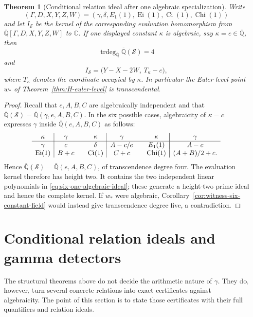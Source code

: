 \documentclass[11pt]{article}
\newtheorem{theorem}{Theorem}[section]
\theoremstyle{definition}
\theoremstyle{remark}
\newcommand{\Qbar}{\overline{\mathbb Q}}
\newcommand{\C}{\mathbb C}
\newcommand{\trdeg}{\operatorname{trdeg}}
\newcommand{\Ei}{\operatorname{Ei}}
\newcommand{\Ci}{\operatorname{Ci}}
\newcommand{\Chi}{\operatorname{Chi}}
\begin{document}
\begin{theorem}[Conditional relation ideal after one algebraic specialization]
\label{thm:six-one-algebraic}
Write
\[
 (\Gamma,D,X,Y,Z,W)
 =
 (\gamma,\delta,E_1(1),\Ei(1),\Ci(1),\Chi(1))
\]
and let \(I_{\mathcal S}\) be the kernel of the corresponding evaluation
homomorphism from \(\Qbar[\Gamma,D,X,Y,Z,W]\) to \(\C\).  If one displayed
constant \(\kappa\) is algebraic, say \(\kappa=c\in\Qbar\), then
\[
 \trdeg_{\Qbar}\Qbar(\mathcal S)=4
\]
and
\begin{equation}\label{eq:six-one-algebraic-ideal}
 \boxed{
 I_{\mathcal S}
 =\bigl(Y-X-2W,\ T_\kappa-c\bigr),}
\end{equation}
where \(T_\kappa\) denotes the coordinate occupied by \(\kappa\).  In
particular the Euler-level point \(w_*\) of
Theorem~\ref{thm:H-euler-level} is transcendental.
\end{theorem}

\begin{proof}
Recall that \(e,A,B,C\) are algebraically independent and that
\(\Qbar(\mathcal S)=\Qbar(\gamma,e,A,B,C)\).  In the six possible cases,
algebraicity of \(\kappa=c\) expresses \(\gamma\) inside
\(\Qbar(e,A,B,C)\) as follows:
\[
\begin{array}{c|c@{\qquad}c|c@{\qquad}c|c}
 \kappa&\gamma&\kappa&\gamma&\kappa&\gamma\\ \hline
 \gamma&c&\delta&A-c/e&E_1(1)&A-c\\
 \Ei(1)&B+c&\Ci(1)&C+c&\Chi(1)&(A+B)/2+c.
\end{array}
\]
Hence \(\Qbar(\mathcal S)=\Qbar(e,A,B,C)\), of transcendence degree four.
The evaluation kernel therefore has height two.  It contains the two
independent linear polynomials in \eqref{eq:six-one-algebraic-ideal}; these
generate a height-two prime ideal and hence the complete kernel.  If \(w_*\)
were algebraic, Corollary~\ref{cor:witness-six-constant-field} would instead
give transcendence degree five, a contradiction.
\end{proof}

\section{Conditional relation ideals and gamma detectors}
\label{sec:gamma-detectors}

The structural theorems above do not decide the arithmetic nature of
\(\gamma\).  They do, however, turn several concrete relations into exact
certificates against algebraicity.  The point of this section is to state
those certificates with their full quantifiers and relation ideals.
\end{document}
